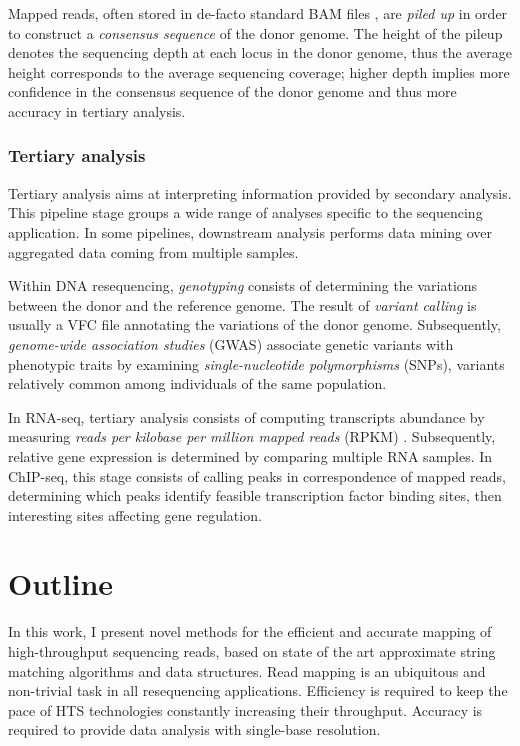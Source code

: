 Mapped reads, often stored in de-facto standard BAM files \citep{Li2009a}, are \emph{piled up} in order to construct a \emph{consensus sequence} of the donor genome.
The height of the pileup denotes the sequencing depth at each locus in the donor genome, thus the average height corresponds to the average sequencing coverage;
higher depth implies more confidence in the consensus sequence of the donor genome and thus more accuracy in tertiary analysis.

\subsubsection{Tertiary analysis}

Tertiary analysis aims at interpreting information provided by secondary analysis.
This pipeline stage groups a wide range of analyses specific to the sequencing application.
In some pipelines, downstream analysis performs data mining over aggregated data coming from multiple samples.

Within DNA resequencing, \emph{genotyping} consists of determining the variations between the donor and the reference genome.
The result of \emph{variant calling} is usually a VFC file annotating the variations of the donor genome.
Subsequently, \emph{genome-wide association studies} (GWAS) associate genetic variants with phenotypic traits by examining \emph{single-nucleotide polymorphisms} (SNPs), variants relatively common among individuals of the same population.

In RNA-seq, tertiary analysis consists of computing transcripts abundance by measuring \emph{reads per kilobase per million mapped reads} (RPKM) \citep{Mortazavi2008}.
Subsequently, relative gene expression is determined by comparing multiple RNA samples.
In ChIP-seq, this stage consists of calling peaks in correspondence of mapped reads, determining which peaks identify feasible transcription factor binding sites, then interesting sites affecting gene regulation.


\section{Outline}

In this work, I present novel methods for the efficient and accurate mapping of high-throughput sequencing reads, based on state of the art approximate string matching algorithms and data structures.
Read mapping is an ubiquitous and non-trivial task in all resequencing applications.
Efficiency is required to keep the pace of HTS technologies constantly increasing their throughput.
Accuracy is required to provide data analysis with single-base resolution.

